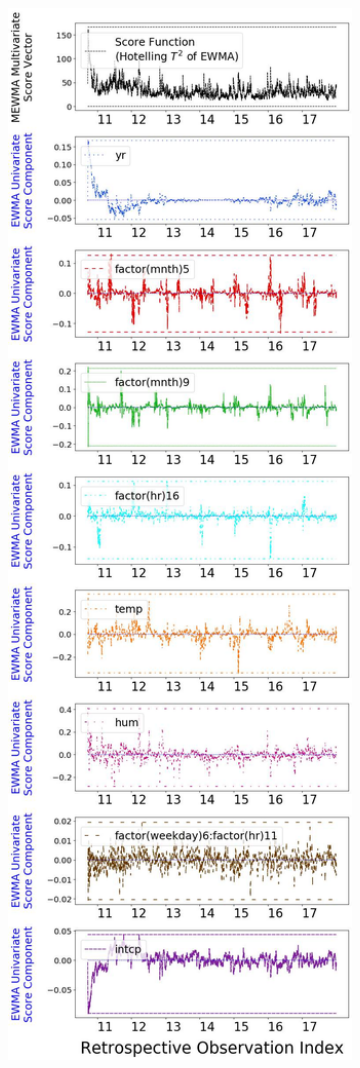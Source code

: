 \documentclass[twoside,11pt]{article}
\begin{document}
\begin{figure}[H]
\centering
    \begin{subfigure}[t]{0.304\linewidth}
     \centering
         \includegraphics[width=1.0\textwidth, trim=.0in .0in .0in .0in, clip]{../figures/v14/bike_sharing/reg_lin_C/quadr/Compressed_PII_pos_single_retro_bike_fisher_mlines_with_regu_1e-08_0_0001_0_01_99_99.png}

\end{subfigure}
\end{figure}
\end{document}
